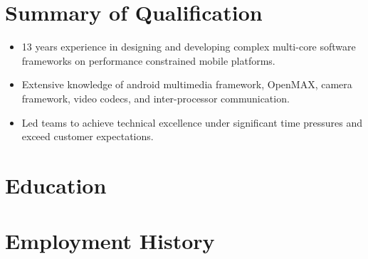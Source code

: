 \documentclass[11pt,letterpaper]{moderncv}
\begin{document}
\maketitle

\section{Summary of Qualification}
\cvline{}
	{
		\begin{itemize}
			\item 13 years experience in designing and developing complex multi-core
			software frameworks on performance constrained mobile platforms.
			\item Extensive knowledge of android multimedia framework, OpenMAX, camera 
			framework, video codecs, and inter-processor communication. 
			\item Led teams to achieve technical excellence under significant time 
			pressures and exceed customer expectations. 
		\end{itemize}}{}{}{}{}

\section{Education}

\cvline  {}{}

\section{Employment History}
\end{document}

